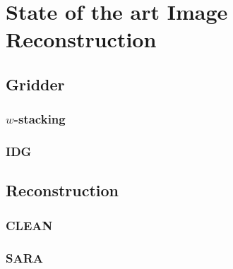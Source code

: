 \section{State of the art Image Reconstruction}

\subsection{Gridder}

\subsubsection{$w$-stacking}

\subsubsection{IDG}


\subsection{Reconstruction}
\subsubsection{CLEAN}

\subsubsection{SARA}


















